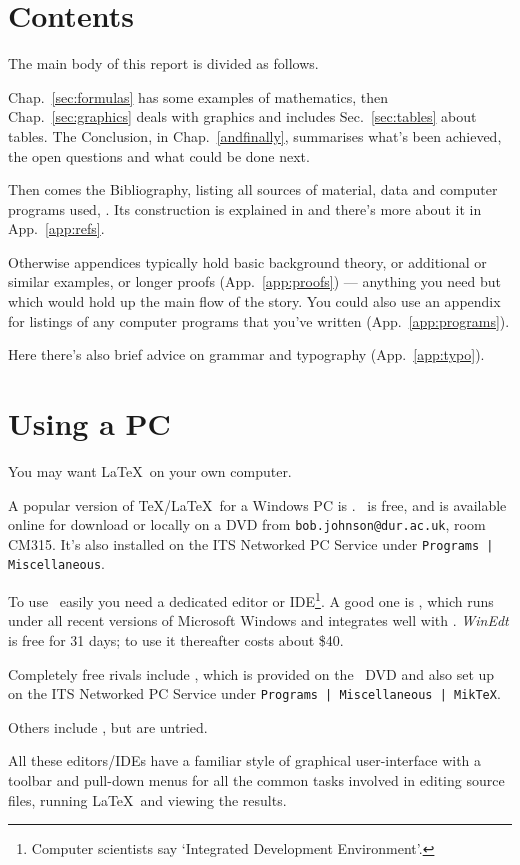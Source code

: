 \section{Contents}\label{intro:contents}
The main body of this report is divided as follows.
\par
Chap.~\ref{sec:formulas} has some examples of mathematics, then
Chap.~\ref{sec:graphics} deals with graphics and includes
Sec.~\ref{sec:tables} about tables. The Conclusion, in
Chap.~\ref{andfinally}, summarises what's been achieved, the open
questions and what could be done next.
\par
Then comes the Bibliography, listing all sources of material, data and
computer programs used, \etc. Its construction is explained in
\cite[Sec.~4.2]{NSS} and there's more about it in App.~\ref{app:refs}.
\par
Otherwise appendices typically hold basic background theory, or
additional or similar examples, or longer proofs (App.~\ref{app:proofs})
 --- anything you need but which would hold up the main flow of the
story. You could also use an appendix for listings of any computer
programs that you've written (App.~\ref{app:programs}).
\par
Here there's also brief advice on grammar and typography
(App.~\ref{app:typo}).
%
\section{Using a PC}\label{sec:intro:parttwo}
You may want \LaTeX\ on your own computer.
\par
A popular version of \TeX/\LaTeX\ for a Windows PC is 
\cite{MKT}. \miktex\ is free, and is available online for 
download \cite{LAT} or locally on a DVD from
\texttt{bob.johnson@dur.ac.uk}, room CM315. It's also installed on the
ITS Networked PC Service under \texttt{Programs | Miscellaneous}.
\par
To use \miktex\ easily you need a dedicated
editor or IDE\footnote{Computer scientists say \lq Integrated 
Development Environment'.}. A good one is  \cite{WDT}, 
which runs under all recent versions of Microsoft Windows and integrates 
well with \miktex. \textsl{WinEdt} is free for 31 days; to use
it thereafter costs about \$40.
\par 
Completely free rivals include  \cite{TXC}, which is
provided on the \miktex\ DVD and also set up on the ITS Networked PC
Service under \texttt{Programs | Miscellaneous | MikTeX}.
\par
Others include \eg {} \cite{WSH}, but are untried.
\par
All these editors/IDEs have a familiar style of graphical user-interface
with a toolbar and pull-down menus for all the common tasks involved in
editing source files, running \LaTeX\ and viewing the results.
